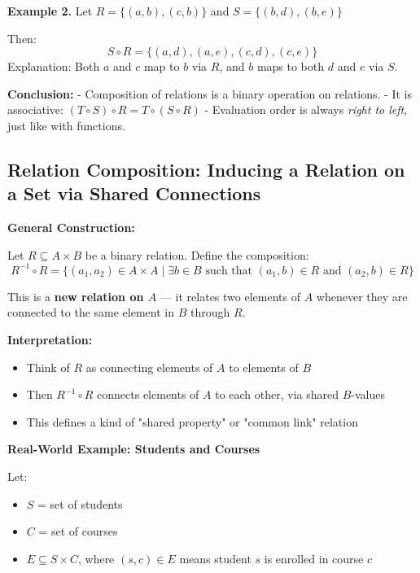 \documentclass[10pt]{article}
\theoremstyle{plain}
\theoremstyle{definition}
\begin{document}
	\textbf{Example 2.}  
	Let $R = \{(a, b), (c, b)\}$ and $S = \{(b, d), (b, e)\}$
	
	Then:
	\[
	S \circ R = \{(a, d), (a, e), (c, d), (c, e)\}
	\]
	Explanation: Both $a$ and $c$ map to $b$ via $R$, and $b$ maps to both $d$ and $e$ via $S$.
	
	\textbf{Conclusion:}  
	- Composition of relations is a binary operation on relations.  
	- It is associative: $(T \circ S) \circ R = T \circ (S \circ R)$  
	- Evaluation order is always \emph{right to left}, just like with functions.
	
	\subsection*{Relation Composition: Inducing a Relation on a Set via Shared Connections}
	
	\textbf{General Construction:}
	
	Let $R \subseteq A \times B$ be a binary relation.  
	Define the composition:
	\[
	R^{-1} \circ R = \{ (a_1, a_2) \in A \times A \mid \exists b \in B \text{ such that } (a_1, b) \in R \text{ and } (a_2, b) \in R \}
	\]
	
	This is a \textbf{new relation on $A$} — it relates two elements of $A$ whenever they are connected to the same element in $B$ through $R$.
	
	\vspace{1em}
	
	\textbf{Interpretation:}
	\begin{itemize}
		\item Think of $R$ as connecting elements of $A$ to elements of $B$
		\item Then $R^{-1} \circ R$ connects elements of $A$ to each other, via shared $B$-values
		\item This defines a kind of "shared property" or "common link" relation
	\end{itemize}
	
	\vspace{1em}
	
	\textbf{Real-World Example: Students and Courses}
	
	Let:
	\begin{itemize}
		\item $S$ = set of students
		\item $C$ = set of courses
		\item $E \subseteq S \times C$, where $(s, c) \in E$ means student $s$ is enrolled in course $c$
	\end{itemize}
	
\end{document}
